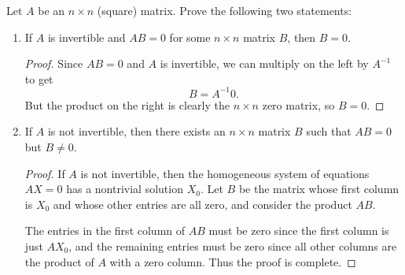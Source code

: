  Let $A$ be an $n\times n$ (square) matrix. Prove the
following two statements:
\begin{enumerate}
\item If $A$ is invertible and $AB = 0$ for some $n\times n$ matrix
  $B$, then $B = 0$.
  \begin{proof}
    Since $AB = 0$ and $A$ is invertible, we can multiply on the left
    by $A^{-1}$ to get
    \begin{equation*}
      B = A^{-1}0.
    \end{equation*}
    But the product on the right is clearly the $n\times n$ zero
    matrix, so $B = 0$.
  \end{proof}
\item If $A$ is not invertible, then there exists an $n\times n$
  matrix $B$ such that $AB = 0$ but $B\neq0$.
  \begin{proof}
    If $A$ is not invertible, then the homogeneous system of equations
    $AX = 0$ has a nontrivial solution $X_0$. Let $B$ be the matrix
    whose first column is $X_0$ and whose other entries are all zero,
    and consider the product $AB$.

    The entries in the first column of $AB$ must be zero since the
    first column is just $AX_0$, and the remaining entries must be
    zero since all other columns are the product of $A$ with a zero
    column. Thus the proof is complete.
  \end{proof}
\end{enumerate}
